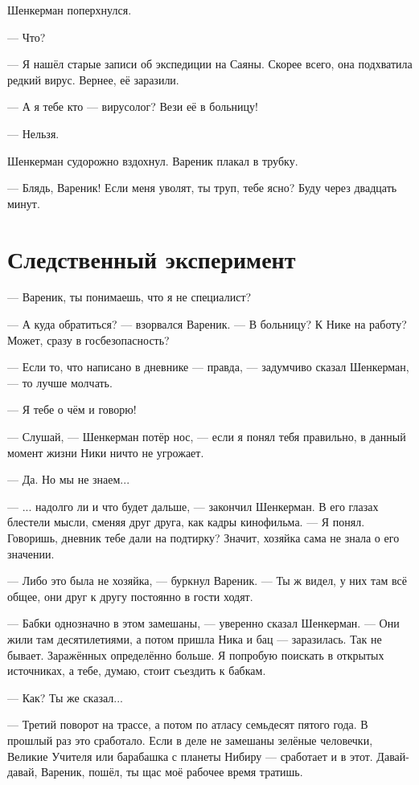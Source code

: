 \documentclass[a4paper,10pt,fleqn]{book}\usepackage{polyglossia}\setdefaultlanguage{english}\setotherlanguage{russian}\defaultfontfeatures{Ligatures=TeX,Mapping=tex-text} \usepackage{xcolor}\definecolor{lightgray}{HTML}{bbbbbb}\color{lightgray}\newcommand{\ml}[3]{\textcolor{black}{#3}}
\begin{document}
Шенкерман поперхнулся.

--- Что?

--- Я нашёл старые записи об экспедиции на Саяны.
Скорее всего, она подхватила редкий вирус.
Вернее, её заразили.

--- А я тебе кто --- вирусолог?
Вези её в больницу!

--- Нельзя.

Шенкерман судорожно вздохнул.
Вареник плакал в трубку.

--- Блядь, Вареник!
Если меня уволят, ты труп, тебе ясно?
Буду через двадцать минут.

\section{Следственный эксперимент}

--- Вареник, ты понимаешь, что я не специалист?

--- А куда обратиться? --- взорвался Вареник.
--- В больницу?
К Нике на работу?
Может, сразу в госбезопасность?

--- Если то, что написано в дневнике --- правда, --- задумчиво сказал Шенкерман, --- то лучше молчать.

--- Я тебе о чём и говорю!

--- Слушай, --- Шенкерман потёр нос, --- если я понял тебя правильно, в данный момент жизни Ники ничто не угрожает.

--- Да.
Но мы не знаем...

---  ... надолго ли и что будет дальше, --- закончил Шенкерман.
В его глазах блестели мысли, сменяя друг друга, как кадры кинофильма.
--- Я понял.
Говоришь, дневник тебе дали на подтирку?
Значит, хозяйка сама не знала о его значении.

--- Либо это была не хозяйка, --- буркнул Вареник.
--- Ты ж видел, у них там всё общее, они друг к другу постоянно в гости ходят.

--- Бабки однозначно в этом замешаны, --- уверенно сказал Шенкерман.
--- Они жили там десятилетиями, а потом пришла Ника и бац --- заразилась.
Так не бывает.
Заражённых определённо больше.
Я попробую поискать в открытых источниках, а тебе, думаю, стоит съездить к бабкам.

--- Как?
Ты же сказал...

--- Третий поворот на трассе, а потом по атласу семьдесят пятого года.
В прошлый раз это сработало.
Если в деле не замешаны зелёные человечки, Великие Учителя или барабашка с планеты Нибиру --- сработает и в этот.
Давай-давай, Вареник, пошёл, ты щас моё рабочее время тратишь.
\end{document}
